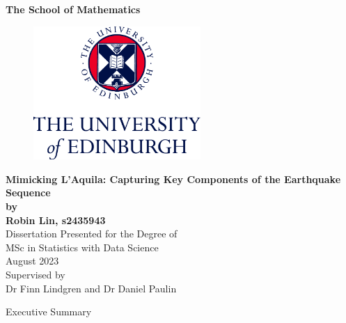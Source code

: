 \documentclass[11pt,twoside]{article}
\numberwithin{Theorem}{section}
\numberwithin{Definition}{section}
\numberwithin{Lemma}{section}
\numberwithin{Algorithm}{section}
\numberwithin{equation}{section}
\begin{document}
\pagestyle{empty}


\begin{titlepage}
\vspace*{.5em}
\center
\textbf{\Large{The School of Mathematics}} \\
\vspace*{1em}
\begin{figure}[!h]
\centering
\includegraphics[width=180pt]{CentredLogoCMYK.jpg}
\end{figure}
\vspace{2em}
\textbf{\Huge{Mimicking L'Aquila: Capturing Key Components of the Earthquake Sequence}}\\[2em]
\textbf{\LARGE{by}}\\
\vspace{2em}
\textbf{\LARGE{Robin Lin, s2435943}}\\
\vspace{6.5em}
\Large{Dissertation Presented for the Degree of\\
MSc in Statistics with Data Science}\\
\vspace{6.5em}
\Large{August 2023}\\
\vspace{3em}
\Large{Supervised by\\Dr Finn Lindgren and Dr Daniel Paulin}
\vfill
\end{titlepage}

\cleardoublepage

\begin{center}
\Large{Executive Summary}
\end{center}
\end{document}
